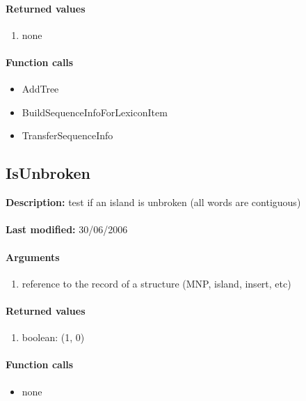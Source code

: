 \paragraph{Returned values}
\begin{enumerate}
\item none
\end{enumerate}

\paragraph{Function calls}
\begin{itemize}
\item AddTree
\item BuildSequenceInfoForLexiconItem
\item TransferSequenceInfo
\end{itemize}

\subsection{IsUnbroken}
\textbf{Description:} test if an island is unbroken (all words are contiguous)\\
\\\textbf{Last modified:} 30/06/2006

\paragraph{Arguments}
\begin{enumerate}
\item reference to the record of a structure (MNP, island, insert, etc)
\end{enumerate}

\paragraph{Returned values}
\begin{enumerate}
\item boolean: (1, 0)
\end{enumerate}

\paragraph{Function calls}
\begin{itemize}
\item none
\end{itemize}

